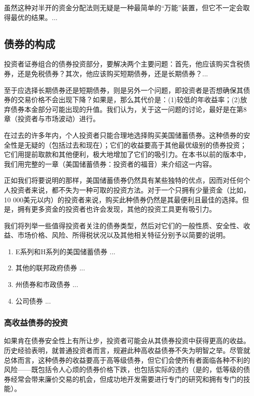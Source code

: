 \documentclass[12pt,oneside]{book}
\begin{document}
虽然这种对半开的资金分配法则无疑是一种最简单的“万能”装置，但它不一定会取得最优的结果。...


\subsection{债券的构成}
投资者证券组合的债券投资部分，要解决两个主要问题：首先，他应该购买含税债券，还是免税债券？其次，他应该购买短期债券，还是长期债券？...

至于应选择长期债券还是短期债券，则是另外一个问题，即投资者是否想确保其债券的交易价格不会出现下降？如果是，那么其代价是：(1)较低的年收益率；(2)放弃债券本金部分可能出现的升值。我们认为，关于这一问题的讨论，最好是在第8章（投资者与市场波动）进行。

在过去的许多年内，个人投资者只能合理地选择购买美国储蓄债券。这种债券的安全性是无疑的（包括过去和现在）；它们的收益要高于其他最优级别的债券投资；它们用提前取款和其他便利，极大地增加了它们的吸引力。在本书以前的版本中，我们用完整的一章（美国储蓄债券：投资者的福音）来介绍这一内容。

正如我们将要说明的那样，美国储蓄债券仍然具有某些独特的优点，因而对任何个人投资者来说，都不失为一种可取的投资方法。对于一个只拥有少量资金（比如，10 000美元以内）的投资者来说，购买此种债券仍然是其最便利且最佳的选择。但是，拥有更多资金的投资者也许会发现，其他的投资工具更有吸引力。

我们将列举一些值得投资者关注的债券类型，然后对它们的一般性质、安全性、收益、市场价格、风险、所得税状况以及其他相关特征分别予以简要的说明。

\begin{enumerate}
\item E系列和H系列的美国储蓄债券 ...
\item 其他的联邦政府债券 ...
\item 州债券和市政债券 ...
\item 公司债券 ...
\end{enumerate}



\subsubsection{高收益债券的投资}
如果肯在债券安全性上有所让步，投资者可能会从其债券投资中获得更高的收益。历史经验表明，就普通投资者而言，规避此种高收益债券不失为明智之举。尽管就总体而言，这种债券的收益要高于高等级债券，但它们会使所有者面临各种不利的风险——既包括令人心烦的债券价格下跌，也包括实际的违约（是的，低等级的债券经常会带来廉价交易的机会，但成功地开发需要进行专门的研究和拥有专门的技能）。
\end{document}

